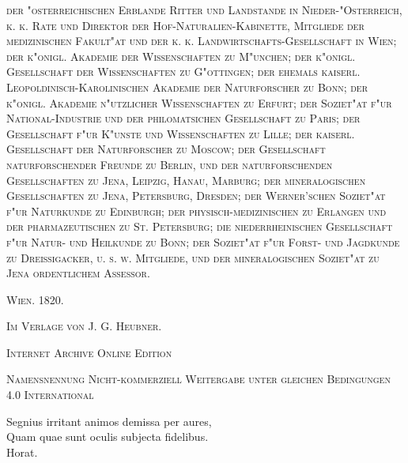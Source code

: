 \documentclass[a4paper, 11pt, oneside, german]{article}
\begin{document}
\begin{titlepage}
    {\scshape\footnotesize der "osterreichischen Erblande Ritter und Landstande in Nieder-"Osterreich, k. k. Rate und Direktor der Hof-Naturalien-Kabinette, Mitgliede der medizinischen Fakult"at und der k. k. Landwirtschafts-Gesellschaft in Wien; der k"onigl. Akademie der Wissenschaften zu M"unchen; der k"onigl. Gesellschaft der Wissenschaften zu G"ottingen; der ehemals kaiserl. Leopoldinisch-Karolinischen Akademie der Naturforscher zu Bonn; der k"onigl. Akademie n"utzlicher Wissenschaften zu Erfurt; der Soziet"at f"ur National-Industrie und der philomatsichen Gesellschaft zu Paris; der Gesellschaft f"ur K"unste und Wissenschaften zu Lille; der kaiserl. Gesellschaft der Naturforscher zu Moscow; der Gesellschaft naturforschender Freunde zu Berlin, und der naturforschenden Gesellschaften zu Jena, Leipzig, Hanau, Marburg; der mineralogischen Gesellschaften zu Jena, Petersburg, Dresden; der Werner'schen Soziet"at f"ur Naturkunde zu Edinburgh; der physisch-medizinischen zu Erlangen und der pharmazeutischen zu St. Petersburg; die niederrheinischen Gesellschaft f"ur Natur- und Heilkunde zu Bonn; der Soziet"at f"ur Forst- und Jagdkunde zu Dreissigacker, u. s. w. Mitgliede, und der mineralogischen Soziet"at zu Jena ordentlichem Assessor.} %
    
    \vspace*{\fill}

	\vspace{1\baselineskip}

	{\small\scshape Wien. 1820.}
	
	{\small\scshape{Im Verlage von J. G. Heubner.}}
	
	\vspace{0.5\baselineskip} %

    \scshape Internet Archive Online Edition  %
	
	{\scshape\small Namensnennung Nicht-kommerziell Weitergabe unter gleichen Bedingungen 4.0 International} %
\end{titlepage}
\setlength{\parskip}{1mm plus1mm minus1mm}
\clearpage
\tableofcontents
\clearpage
\vspace*{\fill}
\begin{center}
Segnius irritant animos demissa per aures,\\
Quam quae sunt oculis subjecta fidelibus.\\
Horat.
\end{center}
\vspace*{\fill}
\clearpage
\end{document}
